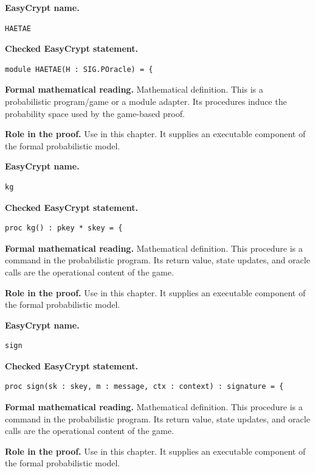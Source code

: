 \begin{formaldefinition}
\noindent\textbf{EasyCrypt name.}
\begin{lstlisting}[language=EasyCrypt,basicstyle=\ttfamily\scriptsize]
HAETAE
\end{lstlisting}
\noindent\textbf{Checked EasyCrypt statement.}
\begin{lstlisting}[language=EasyCrypt,basicstyle=\ttfamily\scriptsize]
module HAETAE(H : SIG.POracle) = {
\end{lstlisting}
\noindent\textbf{Formal mathematical reading.}
Mathematical definition. This is a probabilistic program/game or a module adapter.  Its procedures induce the probability space used by the game-based proof.

\noindent\textbf{Role in the proof.}
Use in this chapter. It supplies an executable component of the formal probabilistic model.

\end{formaldefinition}

\begin{formaldefinition}
\noindent\textbf{EasyCrypt name.}
\begin{lstlisting}[language=EasyCrypt,basicstyle=\ttfamily\scriptsize]
kg
\end{lstlisting}
\noindent\textbf{Checked EasyCrypt statement.}
\begin{lstlisting}[language=EasyCrypt,basicstyle=\ttfamily\scriptsize]
proc kg() : pkey * skey = {
\end{lstlisting}
\noindent\textbf{Formal mathematical reading.}
Mathematical definition. This procedure is a command in the probabilistic program.  Its return value, state updates, and oracle calls are the operational content of the game.

\noindent\textbf{Role in the proof.}
Use in this chapter. It supplies an executable component of the formal probabilistic model.

\end{formaldefinition}

\begin{formaldefinition}
\noindent\textbf{EasyCrypt name.}
\begin{lstlisting}[language=EasyCrypt,basicstyle=\ttfamily\scriptsize]
sign
\end{lstlisting}
\noindent\textbf{Checked EasyCrypt statement.}
\begin{lstlisting}[language=EasyCrypt,basicstyle=\ttfamily\scriptsize]
proc sign(sk : skey, m : message, ctx : context) : signature = {
\end{lstlisting}
\noindent\textbf{Formal mathematical reading.}
Mathematical definition. This procedure is a command in the probabilistic program.  Its return value, state updates, and oracle calls are the operational content of the game.

\noindent\textbf{Role in the proof.}
Use in this chapter. It supplies an executable component of the formal probabilistic model.

\end{formaldefinition}


